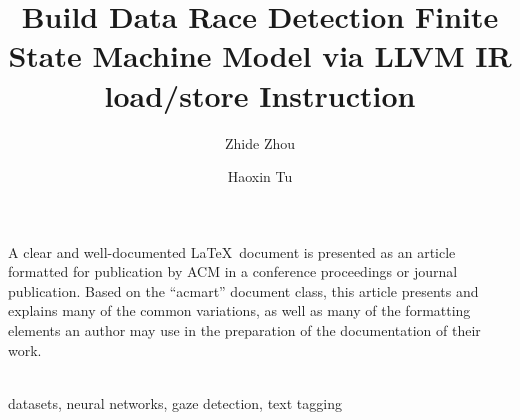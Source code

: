 \documentclass[acmsmall]{acmart}
\begin{document}
\title{Build Data Race Detection Finite State Machine Model via LLVM IR load/store Instruction }


\author{Zhide Zhou}


\author{Haoxin Tu}







\maketitle



A clear and well-documented \LaTeX\ document is presented as an
article formatted for publication by ACM in a conference proceedings
or journal publication. Based on the ``acmart'' document class, this
article presents and explains many of the common variations, as well
as many of the formatting elements an author may use in the
preparation of the documentation of their work.

~\\


 datasets, neural networks, gaze detection, text tagging













\newpage


\end{document}
